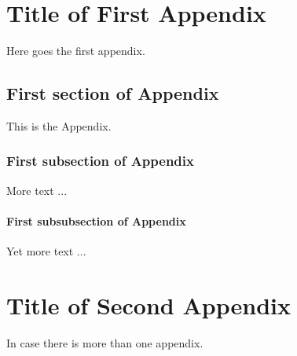 \documentclass[12pt]{template/nuthesis}
\begin{document}
% 


\appendix		%


\chapter{Title of First Appendix} 	%

Here goes the first appendix.


\section{First section of Appendix}	%

This is the Appendix.

\subsection{First subsection of Appendix}  %

More text ...

\subsubsection{First subsubsection of Appendix}  %

Yet more text ...

\chapter{Title of Second Appendix}

In case there is more than one appendix.
\end{document}
